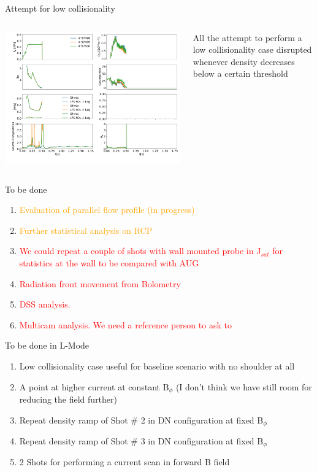 \documentclass[10pt, compress]{beamer}
\newcommand\Fontvi{\fontsize{8}{7.2}\selectfont}
\begin{document}
\begin{frame}{Attempt for low collisionality}
  \begin{columns}[c]
    \begin{column}{0.7\textwidth}
      \includegraphics[width=8.cm]{../../Experiments/TCV/analysis/pdfbox/LowCollisionalityAttempt}
    \end{column}
    \begin{column}{0.3\textwidth}
      All the attempt to perform a low collisionality case disrupted
      whenever density decreases below a certain threshold
    \end{column}
  \end{columns}
\end{frame}

\begin{frame}{To be done}
  \Fontvi
  \begin{enumerate}
    \item \textcolor{orange}{ Evaluation of parallel flow profile (in
    progress)}
  \item \textcolor{orange}{ Further statistical analysis on RCP}
  \item \textcolor{red}{We could repeat a couple of shots with wall
      mounted probe in J$_{sat}$ for statistics at the wall to be
      compared with AUG}
  \item \textcolor{red}{Radiation front movement from Bolometry}
  \item \textcolor{red}{DSS analysis. }
  \item \textcolor{red}{Multicam analysis. We need a reference person
      to ask to}
  \end{enumerate}  
\end{frame}

\begin{frame}{To be done in L-Mode}
  \Fontvi
  \begin{enumerate}
\item  Low collisionality case useful for baseline scenario with no
  shoulder at all
\item  A point at higher current at constant B$_{\phi}$ (I don't think
  we have still room for reducing the field further)
\item  Repeat density ramp of Shot \# 2 in DN configuration at fixed B$_{\phi}$
\item  Repeat density ramp of Shot \# 3 in DN configuration at fixed B$_{\phi}$
\item  2 Shots for performing a current scan in forward B field
\end{enumerate}
\end{frame}
\end{document}
